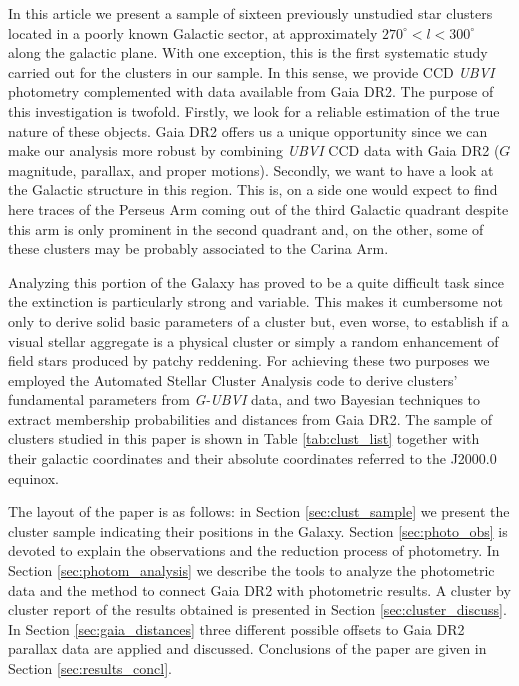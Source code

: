 \documentclass[draft]{aa}
\begin{document}
In this article we present a sample of sixteen previously unstudied star
clusters located in a poorly known Galactic sector, at approximately
$270^\circ<l<300^\circ$ along the galactic plane. With one exception, this is
the first systematic study carried out for the clusters in our sample. In this
sense, we provide CCD \textit{UBVI} photometry complemented with data available
from Gaia DR2. The purpose of this investigation is twofold. Firstly, we look
for a reliable estimation of the true nature of these objects. Gaia DR2 offers
us a unique opportunity since we can make our analysis more robust by combining 
\textit{UBVI} CCD data with Gaia DR2 ($G$ magnitude, parallax, and proper
motions). Secondly, we want to have a look at the Galactic structure in this
region. This is, on a side one would expect to find here traces of the Perseus
Arm coming out of the third Galactic quadrant despite this arm is only
prominent in the second quadrant and, on the other, some of these clusters may
be probably associated to the Carina Arm. 

Analyzing this portion of the Galaxy has proved to be a quite difficult
task since the extinction is particularly strong and variable. This
makes it cumbersome not only to derive solid basic parameters of a cluster
but, even worse, to establish if a visual stellar aggregate is a physical
cluster or simply a random enhancement of field stars produced by patchy
reddening. 
%
For achieving these two purposes we employed the Automated Stellar
Cluster Analysis code \citep[\texttt{ASteCA};][]{Perren_2015} to derive
clusters' fundamental parameters from \textit{G-UBVI} data, and two Bayesian
techniques to extract membership probabilities and distances from Gaia DR2. The
sample of clusters studied in this paper is shown in Table 
\ref{tab:clust_list} together with their galactic coordinates and their
absolute coordinates referred to the J2000.0 equinox.

The layout of the paper is as follows: in Section \ref{sec:clust_sample} we
present the cluster sample indicating their positions in the Galaxy.
Section \ref{sec:photo_obs} is devoted to explain the observations and the
reduction process of photometry. In Section \ref{sec:photom_analysis} we
describe the tools to analyze the photometric data and the method to connect
Gaia DR2 with photometric results. A cluster by cluster report of the results
obtained is presented in Section \ref{sec:cluster_discuss}. In Section
\ref{sec:gaia_distances} three different possible offsets to Gaia DR2 parallax
data are applied and discussed. Conclusions of the paper are given in Section 
\ref{sec:results_concl}.
\end{document}
